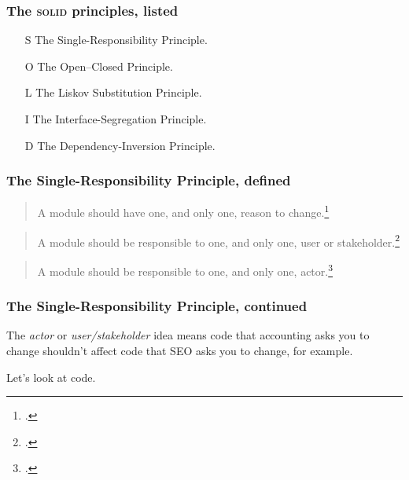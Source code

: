 \documentclass[aspectratio=169]{beamer}
\begin{document}
\begin{frame}
  \frametitle{The \textsc{solid} principles, listed}

  \begin{itemize}
    \item[S] The Single-Responsibility Principle.
    \item[O] The Open--Closed Principle.
    \item[L] The Liskov Substitution Principle.
    \item[I] The Interface-Segregation Principle.
    \item[D] The Dependency-Inversion Principle.
  \end{itemize}
\end{frame}


\begin{frame}
  \frametitle{The Single-Responsibility Principle, defined}

  \begin{quote}
    A module should have one, and only one, reason to
    change.\footnote{\cite[p.~62]{clean-arch}.}
  \end{quote}

  \begin{quote}
    A module should be responsible to one, and only one, user or
    stakeholder.\footnote{\cite[p.~62]{clean-arch}.}
  \end{quote}

  \begin{quote}
    A module should be responsible to one, and only one,
    actor.\footnote{\cite[p.~62]{clean-arch}.}
  \end{quote}
\end{frame}


\begin{frame}
  \frametitle{The Single-Responsibility Principle, continued}

  The \emph{actor} or \emph{user/stakeholder} idea means code that accounting
  asks you to change shouldn't affect code that SEO asks you to change, for
  example.

  \bigskip

  Let's look at code.
\end{frame}

\end{document}
